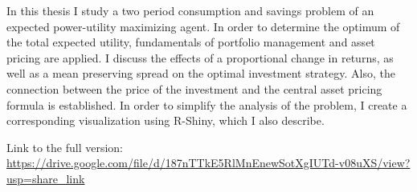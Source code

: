 In this thesis I study a two period consumption and savings problem of an expected power-utility maximizing agent. In order to determine the optimum of the total expected utility, fundamentals of portfolio management and asset pricing are applied. I discuss the effects of a proportional change in returns, as well as a mean preserving spread on the optimal investment strategy. Also, the connection between the price of the investment and the central asset pricing formula is established. In order to simplify the analysis of the problem, I create a corresponding visualization using R-Shiny, which I also describe.\\

\vspace{2cm}

\noindent
Link to the full version:\\
\url{https://drive.google.com/file/d/187nTTkE5RlMnEnewSotXgIUTd-v08uXS/view?usp=share_link}
